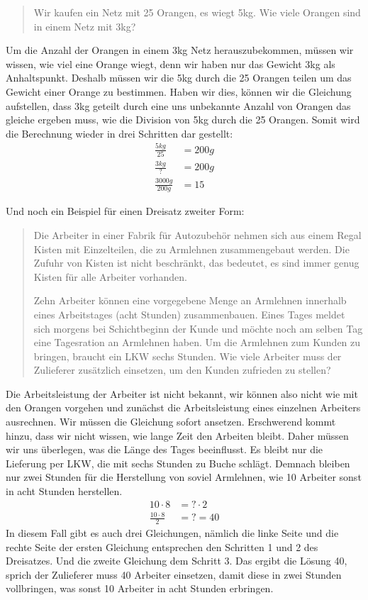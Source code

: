\begin{quote}
Wir kaufen ein Netz mit 25 Orangen, es wiegt 5kg. Wie viele Orangen sind in einem Netz mit 3kg?
\end{quote}
Um die Anzahl der Orangen in einem 3kg Netz herauszubekommen, müssen wir wissen, wie viel eine Orange wiegt, denn wir haben nur das Gewicht 3kg als Anhaltspunkt. Deshalb müssen wir die 5kg durch die 25 Orangen teilen um das Gewicht einer Orange zu bestimmen. Haben wir dies, können wir die Gleichung aufstellen, dass 3kg geteilt durch eine uns unbekannte Anzahl von Orangen das gleiche ergeben muss, wie die Division von 5kg durch die 25 Orangen. Somit wird die Berechnung wieder in drei Schritten dar gestellt:
\begin{equation*}
\begin{split}
\frac{5kg}{25} &=  200g \\
\frac{3kg}{?} &= 200g \\
\frac{3000g}{200g} &= 15
\end{split}
\end{equation*}

Und noch ein Beispiel für einen Dreisatz zweiter Form:
\begin{quote}
Die Arbeiter in einer Fabrik für Autozubehör nehmen sich aus einem Regal Kisten mit Einzelteilen, die zu Armlehnen zusammengebaut werden. Die Zufuhr von Kisten ist nicht beschränkt, das bedeutet, es sind immer genug Kisten für alle Arbeiter vorhanden. 

Zehn Arbeiter können eine vorgegebene Menge an Armlehnen innerhalb eines Arbeitstages (acht Stunden) zusammenbauen. Eines Tages meldet sich morgens bei Schichtbeginn der Kunde und möchte noch am selben Tag eine Tagesration an Armlehnen haben. Um die Armlehnen zum Kunden zu bringen, braucht ein LKW sechs Stunden. Wie viele Arbeiter muss der Zulieferer zusätzlich einsetzen, um den Kunden zufrieden zu stellen?
\end{quote}
Die Arbeitsleistung der Arbeiter ist nicht bekannt, wir können also nicht wie mit den Orangen vorgehen und zunächst die Arbeitsleistung eines einzelnen Arbeiters ausrechnen. Wir müssen die Gleichung sofort ansetzen. Erschwerend kommt hinzu, dass wir nicht wissen, wie lange Zeit den Arbeiten bleibt. Daher müssen wir uns überlegen, was die Länge des Tages beeinflusst. Es bleibt nur die Lieferung per LKW, die mit sechs Stunden zu Buche schlägt. Demnach bleiben nur zwei Stunden für die Herstellung von soviel Armlehnen, wie 10 Arbeiter sonst in acht Stunden herstellen.
\begin{equation*}
\begin{split}
10\cdot 8 &= ? \cdot 2 \\
\frac{10\cdot 8}{2} &= ? = 40
\end{split}
\end{equation*}
In diesem Fall gibt es auch drei Gleichungen, nämlich die linke Seite und die rechte Seite der ersten Gleichung entsprechen den Schritten 1 und 2 des Dreisatzes. Und die zweite Gleichung dem Schritt 3. Das ergibt die Lösung 40, sprich der Zulieferer muss 40 Arbeiter einsetzen, damit diese in zwei Stunden vollbringen, was sonst 10 Arbeiter in acht Stunden erbringen.

